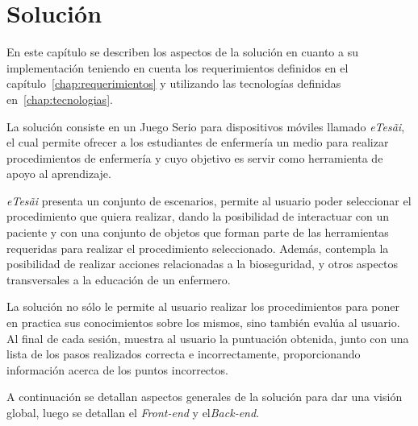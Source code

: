 \chapter{Solución}
\label{chap:solucion}



En este capítulo se describen los aspectos de la solución en cuanto a su
implementación teniendo en cuenta los requerimientos definidos en el
capítulo~\ref{chap:requerimientos} y utilizando las tecnologías definidas
en~\ref{chap:tecnologias}.

La solución consiste en un Juego Serio para dispositivos móviles llamado
\textit{eTes\~{a}i}, el cual permite ofrecer a los  estudiantes de enfermería un
medio para realizar procedimientos de enfermería y cuyo objetivo es servir como
herramienta de apoyo al aprendizaje.

\textit{eTes\~{a}i} presenta un conjunto de escenarios, permite al usuario poder
seleccionar el procedimiento que quiera realizar, dando la posibilidad de
interactuar con un paciente y con una conjunto de objetos que forman parte de
las herramientas requeridas para realizar el procedimiento seleccionado. Además,
contempla la posibilidad de realizar acciones relacionadas a la bioseguridad, y
otros aspectos transversales a la educación de un enfermero.

La solución no sólo le permite al usuario realizar los procedimientos para poner
en practica sus conocimientos sobre los mismos, sino también evalúa al usuario.
Al final de cada sesión, muestra al usuario la puntuación obtenida, junto con
una lista de los pasos realizados correcta e incorrectamente, proporcionando
información acerca de los puntos incorrectos.

A continuación se detallan aspectos generales de la solución para 
dar una visión global, luego se detallan el \emph{Front-end} y 
el\emph{Back-end}.







